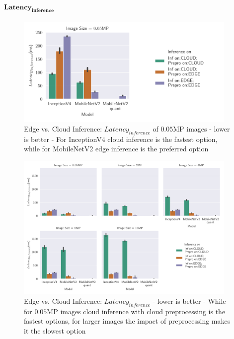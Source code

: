 \paragraph{$\mathbf{Latency_{inference}}$}

\begin{figure}[!htb]
\centering
\includegraphics[width=0.95\textwidth]{./Bilder/single_plots/edge_vs_cloud_plots/Edge_vs_Cloud_Inference_Inference_Latencies_onlyNR.pdf}
\caption[Edge vs. Cloud Inference:  $Latency_{inference}$ of $0.05$MP images - lower is better]{Edge vs. Cloud Inference:  $Latency_{inference}$ of $0.05$MP images - lower is better - For InceptionV4 cloud inference is the fastest option, while for MobileNetV2 edge inference is the preferred option}
\label{fig:EdgeVsCloudInferenceLatNR}
\end{figure}
\begin{figure}[!htb]
\centering
\includegraphics[width=0.95\textwidth]{./Bilder/single_plots/edge_vs_cloud_plots/Edge_vs_Cloud_Inference_Inference_Latencies.pdf}
\caption[Edge vs. Cloud Inference:  $Latency_{inference}$ - lower is better]{Edge vs. Cloud Inference:  $Latency_{inference}$ - lower is better -
While for $0.05$MP images cloud inference with cloud preprocessing is the fastest options, for larger images the impact of preprocessing makes it the slowest option}
\label{fig:EdgeVsCloudInferenceLat}
\end{figure}

